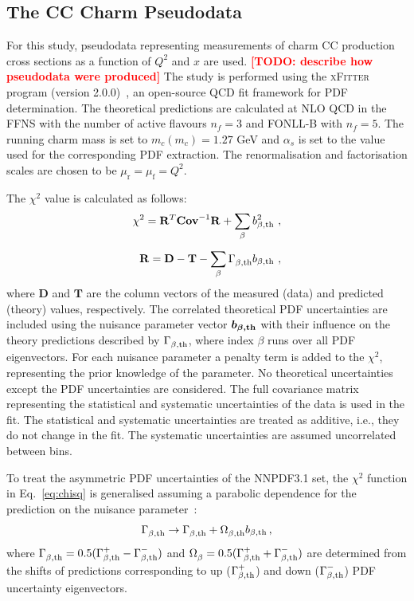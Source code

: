 \documentclass[pdftex,twocolumn,epjc3]{svjour3}          %
\newcommand{\nnpdf} {NNPDF3.1\xspace}
\newcommand{\chisq}{\ensuremath{\chi^2}\xspace}
\newcommand{\xfitter} {\textsc{xFitter}\xspace}
\begin{document}
\subsection{The CC  Charm Pseudodata}
\label{sec:pseudodata}

For this study, pseudodata representing measurements of charm CC
production cross sections as a function of $Q^2$ and $x$ are
used.
%
\textcolor{red}{\bf [TODO: describe how pseudodata were produced]}
%
The study is
performed using the \xfitter program (version
2.0.0)~\cite{Alekhin:2014irh}, an open-source QCD fit framework for
PDF determination. The theoretical predictions are calculated at NLO
QCD in the FFNS with the number of active flavours $n_f = 3$ and
FONLL-B with $n_f = 5$. The running charm mass is set to $m_c(m_c) =
1.27$ GeV and $\alpha_s$ is set to the value used for the
corresponding PDF extraction.  The renormalisation and factorisation
scales are chosen to be $\mu_\mathrm{r} = \mu_\mathrm{f} = Q^2$.

The \chisq value is calculated as follows:
\begin{equation}
\begin{split}
  \chisq = \mathbf{R}^{T}_{} \mathbf{Cov}^{-1}_{} \mathbf{R}_{} + \sum_{\beta} b_{\beta,\rm th}^2 \ , \\[5pt]
  \mathbf{R} = \mathbf{D} - \mathbf{T} - \sum_{\beta} \Gamma^{}_{\beta,\rm th} b_{\beta,\rm th} \ ,
\label{eq:chisq}
\end{split}
\end{equation}
%
where $\mathbf{D}$ and $\mathbf{T}$ are the column vectors of the
measured (data) and predicted (theory) values, respectively.  The
correlated theoretical PDF uncertainties are included using the
nuisance parameter vector $\boldsymbol{b_{\beta, \rm th}}$ with their
influence on the theory predictions described by $\Gamma^{}_{\beta,\rm th}$,
where index $\beta$ runs over all PDF eigenvectors.  For each
nuisance parameter a penalty term is added to the \chisq, representing
the prior knowledge of the parameter.  No theoretical uncertainties
except the PDF uncertainties are considered.  The full covariance
matrix representing the statistical and systematic uncertainties of
the data is used in the fit. The statistical and systematic
uncertainties are treated as additive, i.e., they do not change in the
fit. The systematic uncertainties are assumed uncorrelated between
bins.

To treat the asymmetric PDF uncertainties of the \nnpdf set, the
\chisq function in Eq.~\ref{eq:chisq} is generalised assuming a
parabolic dependence for the prediction on the nuisance
parameter~\cite{Alekhin:2014irh}:
\begin{eqnarray}
\Gamma^{}_{\beta, \rm th} \to \Gamma^{}_{\beta, \rm th} +  \Omega^{}_{\beta, \rm th}b_{\beta, \rm th}\,, \label{eq:iter}
\end{eqnarray}
where $\Gamma^{}_{\beta, \rm th} = 0.5(\Gamma^{+}_{\beta, \rm th} - \Gamma^{-}_{\beta, \rm th})$ and $\Omega^{}_{\beta} = 0.5(\Gamma^{+}_{\beta, \rm th}
+ \Gamma^{-}_{\beta, \rm th})$ are determined from the shifts of predictions corresponding to up ($\Gamma^{+}_{\beta, \rm th}$) and down ($ \Gamma^{-}_{\beta, \rm th}$) PDF uncertainty eigenvectors.
\end{document}
